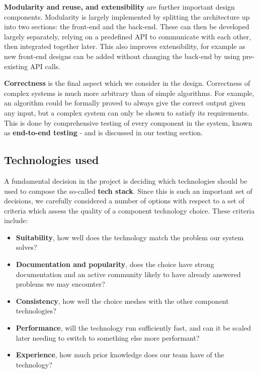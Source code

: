 \documentclass[10pt]{article}
\begin{document}
\textbf{Modularity and reuse, and extensibility} are further
important design components. Modularity is largely implemented by splitting the
architecture up into two sections: the front-end and the back-end. These can then
be developed largely separately, relying on a predefined API to communicate with
each other, then integrated together later. This also improves extensibility,
for example as new front-end designs can be added without changing the back-end by
using pre-existing API calls.

\textbf{Correctness} is the final aspect which we consider in the design.
Correctness of complex systems is much more arbitrary than of simple algorithms.
For example, an algorithm could be formally proved to always give the correct
output given any input, but a complex system can only be shown to satisfy its
requirements. This is done by comprehensive testing of every component in the
system, known as \textbf{end-to-end testing} - and is discussed in our testing
section.


\subsection{Technologies used}

A fundamental decision in the project is deciding which technologies should be
used to compose the so-called \textbf{tech stack}. Since this is such an
important set of decisions, we carefully considered a number of options with
respect to a set of criteria which assess the quality of a component technology
choice. These criteria include:
\begin{itemize}[leftmargin=1.2cm,noitemsep,align=left]
    \item
        \textbf{Suitability}, how well does the technology match the problem
        our system solves?
    \item
        \textbf{Documentation and popularity}, does the choice have strong
        documentation and an active community likely to have already answered problems
        we may encounter?
    \item
        \textbf{Consistency}, how well the choice meshes with the other
        component technologies?
    \item
        \textbf{Performance}, will the technology run sufficiently fast,
        and can it be scaled later needing to switch to something else more performant?
    \item
        \textbf{Experience}, how much prior knowledge does our team have of the technology?
\end{itemize}
\end{document}

